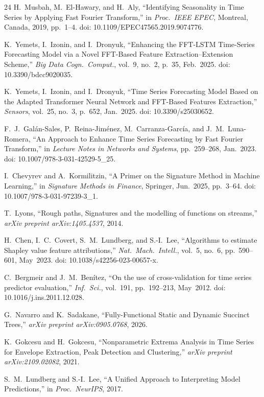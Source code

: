 \documentclass[a4paper,12pt]{article}
\begin{document}
\begin{thebibliography}{24}
 H.~Musbah, M.~El-Hawary, and H.~Aly, ``Identifying Seasonality in Time Series by Applying Fast Fourier Transform,'' in \textit{Proc.\ IEEE EPEC}, Montreal, Canada, 2019, pp.~1--4. doi: 10.1109/EPEC47565.2019.9074776.

 K.~Yemets, I.~Izonin, and I.~Dronyuk, ``Enhancing the FFT-LSTM Time-Series Forecasting Model via a Novel FFT-Based Feature Extraction--Extension Scheme,'' \textit{Big Data Cogn.\ Comput.}, vol.~9, no.~2, p.~35, Feb.~2025. doi: 10.3390/bdcc9020035.

 K.~Yemets, I.~Izonin, and I.~Dronyuk, ``Time Series Forecasting Model Based on the Adapted Transformer Neural Network and FFT-Based Features Extraction,'' \textit{Sensors}, vol.~25, no.~3, p.~652, Jan.~2025. doi: 10.3390/s25030652.

 F.~J.~Gal\'an-Sales, P.~Reina-Jim\'enez, M.~Carranza-Garc\'ia, and J.~M.~Luna-Romera, ``An Approach to Enhance Time Series Forecasting by Fast Fourier Transform,'' in \textit{Lecture Notes in Networks and Systems}, pp.~259--268, Jan.~2023. doi: 10.1007/978-3-031-42529-5\_25.

 I.~Chevyrev and A.~Kormilitzin, ``A Primer on the Signature Method in Machine Learning,'' in \textit{Signature Methods in Finance}, Springer, Jun.~2025, pp.~3--64. doi: 10.1007/978-3-031-97239-3\_1.

 T.~Lyons, ``Rough paths, Signatures and the modelling of functions on streams,'' \textit{arXiv preprint arXiv:1405.4537}, 2014.

 H.~Chen, I.~C.~Covert, S.~M.~Lundberg, and S.-I.~Lee, ``Algorithms to estimate Shapley value feature attributions,'' \textit{Nat.\ Mach.\ Intell.}, vol.~5, no.~6, pp.~590--601, May~2023. doi: 10.1038/s42256-023-00657-x.

 C.~Bergmeir and J.~M.~Ben\'itez, ``On the use of cross-validation for time series predictor evaluation,'' \textit{Inf.\ Sci.}, vol.~191, pp.~192--213, May~2012. doi: 10.1016/j.ins.2011.12.028.

 G.~Navarro and K.~Sadakane, ``Fully-Functional Static and Dynamic Succinct Trees,'' \textit{arXiv preprint arXiv:0905.0768}, 2026.

 K.~Gokcesu and H.~Gokcesu, ``Nonparametric Extrema Analysis in Time Series for Envelope Extraction, Peak Detection and Clustering,'' \textit{arXiv preprint arXiv:2109.02082}, 2021.

 S.~M.~Lundberg and S.-I.~Lee, ``A Unified Approach to Interpreting Model Predictions,'' in \textit{Proc.\ NeurIPS}, 2017.


\end{thebibliography}
\end{document}
